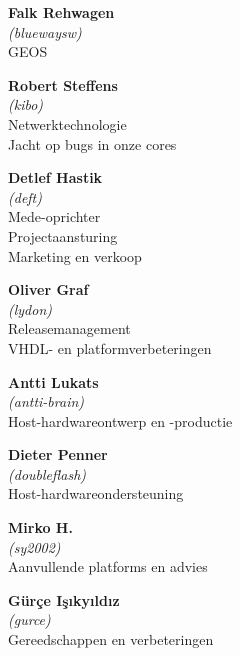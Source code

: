 \begin{mega65thanks}
\begin{minipage}{\linewidth}
    {\large\bf Falk Rehwagen} \\
    \textit{(bluewaysw)} \\
    GEOS
\end{minipage}

\begin{minipage}{\linewidth}
    {\large\bf Robert Steffens} \\
    \textit{(kibo)} \\
    Netwerktechnologie \\
    Jacht op bugs in onze cores
\end{minipage}

\begin{minipage}{\linewidth}
    {\large\bf Detlef Hastik} \\
    \textit{(deft)} \\
    Mede-oprichter \\
    Projectaansturing \\
    Marketing en verkoop
\end{minipage}

\begin{minipage}{\linewidth}
    {\large\bf Oliver Graf} \\
    \textit{(lydon)} \\
    Releasemanagement \\
    VHDL- en platformverbeteringen
\end{minipage}

\begin{minipage}{\linewidth}
    {\large\bf Antti Lukats} \\
    \textit{(antti-brain)} \\
    Host-hardwareontwerp en -productie
\end{minipage}

\begin{minipage}{\linewidth}
    {\large\bf Dieter Penner} \\
    \textit{(doubleflash)} \\
    Host-hardwareondersteuning
\end{minipage}

\begin{minipage}{\linewidth}
    {\large\bf Mirko H.} \\
    \textit{(sy2002)} \\
    Aanvullende platforms en advies
\end{minipage}

\begin{minipage}{\linewidth}
    {\large\bf Gürçe Işıkyıldız} \\
    \textit{(gurce)} \\
    Gereedschappen en verbeteringen
\end{minipage}


\end{mega65thanks}
